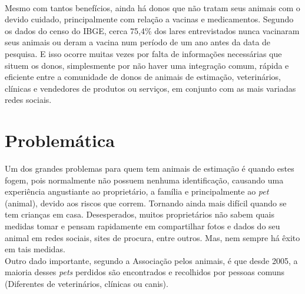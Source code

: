 \\
\indent
Mesmo com tantos benefícios, ainda há donos que não tratam seus animais com o devido cuidado, principalmente com relação a vacinas e medicamentos. Segundo os dados do censo do IBGE, cerca 75,4\% dos lares entrevistados nunca vacinaram seus animais ou deram a vacina num período de um ano antes da data de pesquisa. E isso ocorre muitas vezes por falta de informações necessárias que situem os donos, simplesmente por não haver uma integração comum, rápida e eficiente entre a comunidade de donos de animais de estimação, veterinários, clínicas e vendedores de produtos ou serviços, em conjunto com as mais variadas redes sociais.

\section{Problemática}

Um dos grandes problemas para quem tem animais de estimação é quando estes fogem, pois normalmente não possuem nenhuma identificação, causando uma experiência angustiante ao proprietário, a família e principalmente ao {\it pet} (animal), devido aos riscos que correm. Tornando ainda mais difícil quando se tem crianças em casa. Desesperados, muitos proprietários não sabem quais medidas tomar e pensam rapidamente em compartilhar fotos e dados do seu animal em redes sociais, sites de procura, entre outros. Mas, nem sempre há êxito em tais medidas.
\\
\indent
Outro dado importante, segundo a Associação pelos animais, é que desde 2005, a maioria desses {\it pets} perdidos são encontrados e recolhidos por pessoas comuns (Diferentes de veterinários, clínicas ou canis).


